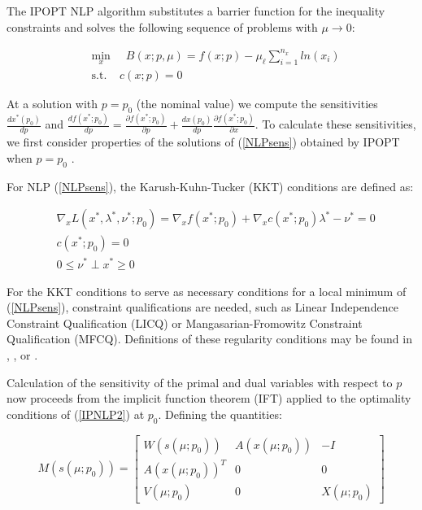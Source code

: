 \documentclass[letter, 11pt]{article}
\newcommand{\matr}[2]{{\left[\begin{array}{#1} #2 \end{array}\right]}}
\newcommand{\parens}[1]{\ensuremath{\left( #1 \right)}}
\newcommand{\func}[2]{\ensuremath{ #1\parens{#2}  }}
\begin{document}
The IPOPT NLP algorithm substitutes a barrier function for the inequality
constraints and solves the following sequence of problems with
$\mu \rightarrow 0$:

\begin{subequations}
\label{IPNLP2}
\begin{eqnarray}
& \min_x  &  \; \; B(x; p, \mu) = f(x; p)  - \mu_{\ell} \sum_{i=1}^{n_x} ln (x_i) \\
& \mbox{s.t.} & c(x; p) = 0
\end{eqnarray}
\end{subequations}

At a solution with $p = p_0$ (the nominal value) we compute the
sensitivities $\frac{d x^{*}(p_0)}{dp}$ and $\frac{df(x^*; p_0)}{d p} =
\frac{\partial f(x^*; p_0)}{\partial p} + \frac{d x(p_0)}{d p}\frac{\partial f(x^*; p_0)}{\partial x}$.  To
calculate these sensitivities, we first
consider properties of the solutions of (\ref{NLPsens}) obtained by
IPOPT when $p = p_0$ \cite{Fiacco1983,forsgren}.


For NLP (\ref{NLPsens}), the Karush-Kuhn-Tucker (KKT) conditions
are defined as:

\begin{subequations}\label{kktc}
\begin{eqnarray}
& \nabla_x L(x^*, \lambda^*, \nu^*; p_0) =
\nabla_x f(x^*; p_0) + \nabla_x c(x^*; p_0)\lambda^* - \nu^* = 0 \\
& c(x^*; p_0) = 0 \\
& 0 \leq \nu^* \perp x^* \geq 0
\end{eqnarray}
\end{subequations}

For the KKT conditions to serve as necessary conditions for a local
minimum of (\ref{NLPsens}), constraint qualifications are needed,
such as Linear Independence Constraint Qualification (LICQ)
or Mangasarian-Fromowitz Constraint Qualification (MFCQ).
Definitions of these regularity conditions may be found in \citet{larrybook},
\citet{nocedalbook}, or \citet{Fiacco1983}.


Calculation of the sensitivity of the primal and dual variables with
respect to $p$ now proceeds from the implicit function theorem (IFT)
applied to the optimality conditions of (\ref{IPNLP2}) at
$p_0$. Defining the quantities:

\begin{equation}  \label{mdef}
  M(s(\mu; p_0)) =
  \matr{ccc}{
    \func{W}{\func{s}{\mu;p_0}} & \func{A}{\func{x}{\mu;p_0}}  & -I\\
   \func{A}{\func{x}{\mu;p_0}} ^T &0 &0\\ \func{V}{\mu;p_0} &0&X(\mu; p_0)}
\end{equation}
\end{document}
